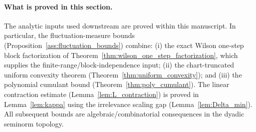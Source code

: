 \paragraph{What is proved in this section.}
The analytic inputs used downstream are proved within this manuscript.
In particular, the fluctuation-measure bounds (Proposition~\ref{ass:fluctuation_bounds}) combine:
(i) the exact Wilson one-step block factorization of Theorem~\ref{thm:wilson_one_step_factorization}, which supplies the finite-range/block-independence input;
(ii) the chart-truncated uniform convexity theorem (Theorem~\ref{thm:uniform_convexity}); and
(iii) the polynomial cumulant bound (Theorem~\ref{thm:poly_cumulant}).
The linear contraction estimate (Lemma~\ref{lem:L_contraction}) is proved in Lemma~\ref{lem:kappa} using the irrelevance scaling gap
(Lemma~\ref{lem:Delta_min}).
All subsequent bounds are algebraic/combinatorial consequences in the dyadic seminorm topology.